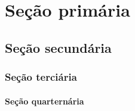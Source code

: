 \chapter{Seção primária}

\section{Seção secundária}

\subsection{Seção terciária}

\subsubsection{Seção quarternária}